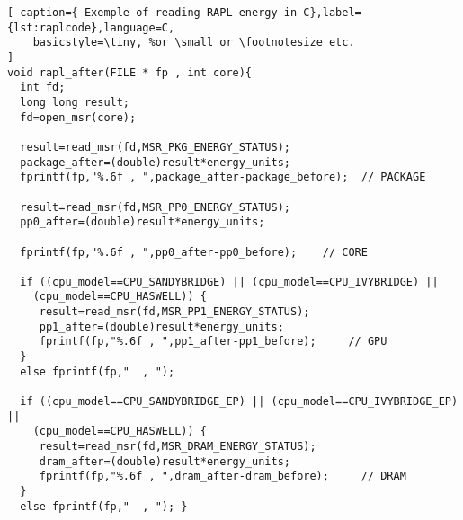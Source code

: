 \begin{lstlisting}[ caption={ Exemple of reading RAPL energy in C},label={lst:raplcode},language=C,
    basicstyle=\tiny, %or \small or \footnotesize etc.
]
void rapl_after(FILE * fp , int core){ 
  int fd;
  long long result;
  fd=open_msr(core);

  result=read_msr(fd,MSR_PKG_ENERGY_STATUS);
  package_after=(double)result*energy_units;
  fprintf(fp,"%.6f , ",package_after-package_before);  // PACKAGE

  result=read_msr(fd,MSR_PP0_ENERGY_STATUS);
  pp0_after=(double)result*energy_units;
  
  fprintf(fp,"%.6f , ",pp0_after-pp0_before);    // CORE

  if ((cpu_model==CPU_SANDYBRIDGE) || (cpu_model==CPU_IVYBRIDGE) ||
	(cpu_model==CPU_HASWELL)) {
     result=read_msr(fd,MSR_PP1_ENERGY_STATUS);
     pp1_after=(double)result*energy_units;
     fprintf(fp,"%.6f , ",pp1_after-pp1_before);     // GPU
  }
  else fprintf(fp,"  , ");   
  
  if ((cpu_model==CPU_SANDYBRIDGE_EP) || (cpu_model==CPU_IVYBRIDGE_EP) ||
	(cpu_model==CPU_HASWELL)) {
     result=read_msr(fd,MSR_DRAM_ENERGY_STATUS);
     dram_after=(double)result*energy_units;
     fprintf(fp,"%.6f , ",dram_after-dram_before);     // DRAM
  }
  else fprintf(fp,"  , "); }
\end{lstlisting}

